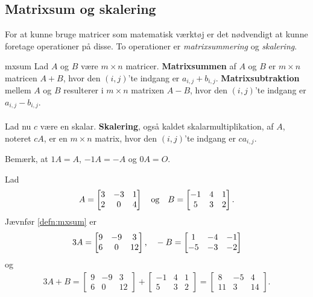 \subsection{Matrixsum og skalering}
%
For at kunne bruge matricer som matematisk værktøj er det nødvendigt at kunne foretage operationer på disse.
To operationer er \textit{matrixsummering} og \textit{skalering}.
%
\begin{defn}{}{mxsum}
Lad $A$ og $B$ være $m \times n$ matricer.
\textbf{Matrixsummen} af $A$ og $B$ er $m \times n$ matricen $A + B$, hvor den $(i,j)$'te indgang er $a_{i,j} + b_{i,j}$.
\textbf{Matrixsubtraktion} mellem $A$ og $B$ resulterer i $m \times n$ matrixen $A-B$, hvor den $(i,j)$'te indgang er $a_{i,j} - b_{i,j}$.
\\\\
Lad nu $c$ være en skalar.
\textbf{Skalering}, også kaldet skalarmultiplikation, af $A$, noteret $cA$, er en $m \times n$ matrix, hvor den $(i,j)$'te indgang er $ca_{i,j}$.
\end{defn}
\noindent
%
Bemærk, at $1A = A$, $-1A = -A$ og $0A = O$.
\\
%
\begin{eks}
Lad 
\begin{align*}
A= 
\begin{bmatrix}
3	&	-3	&	1\\
2	&	0	&	4
\end{bmatrix}
\text{\phantom{---}og\phantom{---}}
B= 
\begin{bmatrix}
-1	&	4	&	1\\
5	&	3	&	2
\end{bmatrix}.
\end{align*}
Jævnfør \ref{defn:mxsum} er
\begin{align*}
3A= 
\begin{bmatrix}
9	&	-9	&	3\\
6	&	0	&	12
\end{bmatrix}
\text{,\phantom{---}}
-B= 
\begin{bmatrix}
1	&	-4	&	-1\\
-5	&	-3	&	-2
\end{bmatrix}
\end{align*}
og
\begin{align*}
3A+B= 
\begin{bmatrix}
9	&	-9	&	3\\
6	&	0	&	12
\end{bmatrix}
+ 
\begin{bmatrix}
-1	&	4	&	1\\
5	&	3	&	2
\end{bmatrix}
=
\begin{bmatrix}
8	&	-5	&	4\\
11	&	3	&	14
\end{bmatrix}.
\end{align*}
\end{eks}
